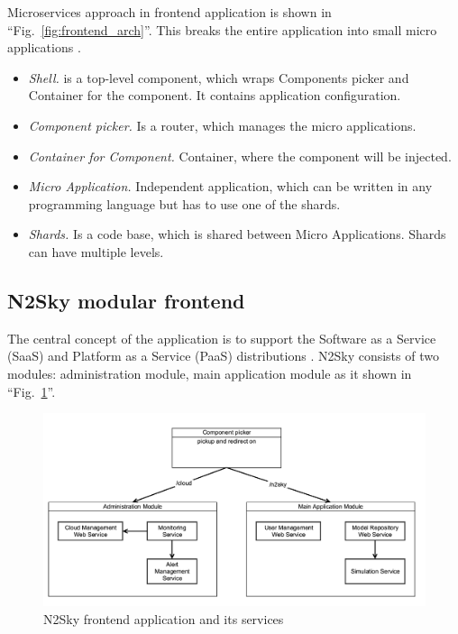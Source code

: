 \documentclass[10pt, conference, compsocconf]{IEEEtran}
\begin{document}
Microservices approach in frontend application is shown in ``Fig.~\ref{fig:frontend_arch}''. This breaks the entire application into small micro applications \cite{frontendMicro}.

\begin{itemize}
\item \emph{Shell.}  is a top-level component, which wraps Components picker and Container for the component. It contains application configuration.
\item \emph{Component picker.} Is a router, which manages the micro applications. 
\item \emph{Container for Component.} Container, where the component will be injected.
\item \emph{Micro Application.} Independent application, which can be written in any programming language but has to use one of the shards.
\item \emph{Shards.} Is a code base, which is shared between Micro Applications. Shards can have multiple levels. 
\end{itemize}
 
\subsection{N2Sky modular frontend}
\label{N2Sky modular frontend}

The central concept of the application is to support the Software as a Service (SaaS) and Platform as a Service (PaaS) distributions \cite{Walraven2014}.  N2Sky consists of two modules: administration module, main application module as it shown in ``Fig.~\ref{fig:modular_design}''.



\begin{figure}[H]
  \includegraphics[width=\linewidth]{img/redirector.png}
  \caption{N2Sky frontend application and its services}
  \label{fig:modular_design}
\end{figure}
\end{document}
